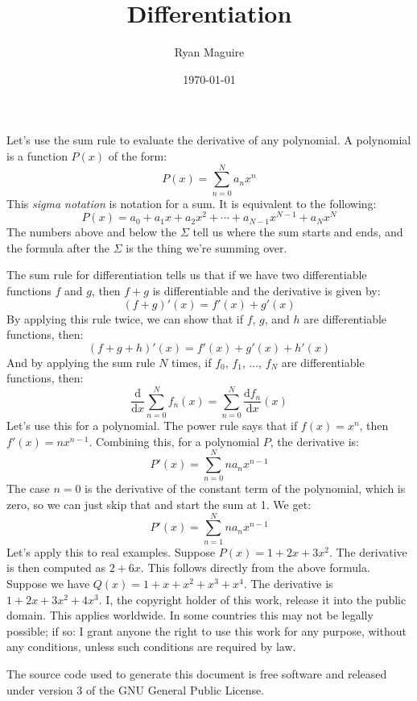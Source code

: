 \documentclass{article}
\title{Differentiation}
\author{Ryan Maguire}
\date{\today}
\begin{document}
    \maketitle
    Let's use the sum rule to evaluate the derivative of any polynomial. A
    polynomial is a function $P(x)$ of the form:
    \begin{equation}
        P(x)=\sum_{n=0}^{N}a_{n}x^{n}
    \end{equation}
    This \textit{sigma notation} is notation for a sum. It is equivalent to the
    following:
    \begin{equation}
        P(x)=a_{0}+a_{1}x+a_{2}x^{2}+\cdots+a_{N-1}x^{N-1}+a_{N}x^{N}
    \end{equation}
    The numbers above and below the $\Sigma$ tell us where the sum starts and
    ends, and the formula after the $\Sigma$ is the thing we're summing over.
    \par\hfill\par
    The sum rule for differentiation tells us that if we have two
    differentiable functions $f$ and $g$, then $f+g$ is differentiable and the
    derivative is given by:
    \begin{equation}
        (f+g)'(x)=f'(x)+g'(x)
    \end{equation}
    By applying this rule twice, we can show that if $f$, $g$, and $h$ are
    differentiable functions, then:
    \begin{equation}
        (f+g+h)'(x)=f'(x)+g'(x)+h'(x)
    \end{equation}
    And by applying the sum rule $N$ times, if $f_{0}$, $f_{1}$, ...,
    $f_{N}$ are differentiable functions, then:
    \begin{equation}
        \frac{\textrm{d}}{\textrm{d}x}\sum_{n=0}^{N}f_{n}(x)
        =\sum_{n=0}^{N}\frac{\textrm{d}f_{n}}{\textrm{d}x}(x)
    \end{equation}
    Let's use this for a polynomial. The power rule says that if
    $f(x)=x^{n}$, then $f'(x)=nx^{n-1}$. Combining this, for a polynomial
    $P$, the derivative is:
    \begin{equation}
        P'(x)=\sum_{n=0}^{N}na_{n}x^{n-1}
    \end{equation}
    The case $n=0$ is the derivative of the constant term of the polynomial,
    which is zero, so we can just skip that and start the sum at 1. We get:
    \begin{equation}
        P'(x)=\sum_{n=1}^{N}na_{n}x^{n-1}
    \end{equation}
    Let's apply this to real examples. Suppose $P(x)=1+2x+3x^{2}$. The
    derivative is then computed as $2+6x$. This follows directly from the
    above formula. Suppose we have $Q(x)=1+x+x^{2}+x^{3}+x^{4}$. The derivative
    is $1+2x+3x^{2}+4x^{3}$.
    \newpage
    I, the copyright holder of this work, release it into the public domain.
    This applies worldwide. In some countries this may not be legally possible;
    if so: I grant anyone the right to use this work for any purpose, without
    any conditions, unless such conditions are required by law.
    \par\hfill\par
    The source code used to generate this document is free software and released
    under version 3 of the GNU General Public License.
\end{document}
